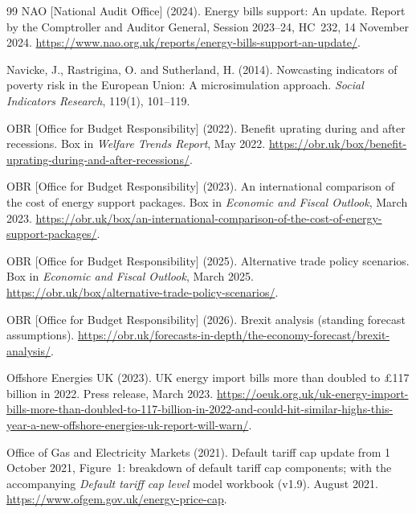 \begin{thebibliography}{99}
NAO [National Audit Office] (2024).
\newblock Energy bills support: An update.
\newblock Report by the Comptroller and Auditor General, Session 2023--24, HC~232, 14 November 2024. \url{https://www.nao.org.uk/reports/energy-bills-support-an-update/}.

Navicke, J., Rastrigina, O. and Sutherland, H. (2014).
\newblock Nowcasting indicators of poverty risk in the European Union: A microsimulation approach.
\newblock \emph{Social Indicators Research}, 119(1), 101--119.

OBR [Office for Budget Responsibility] (2022).
\newblock Benefit uprating during and after recessions.
\newblock Box in \emph{Welfare Trends Report}, May 2022. \url{https://obr.uk/box/benefit-uprating-during-and-after-recessions/}.

OBR [Office for Budget Responsibility] (2023).
\newblock An international comparison of the cost of energy support packages.
\newblock Box in \emph{Economic and Fiscal Outlook}, March 2023. \url{https://obr.uk/box/an-international-comparison-of-the-cost-of-energy-support-packages/}.

OBR [Office for Budget Responsibility] (2025).
\newblock Alternative trade policy scenarios.
\newblock Box in \emph{Economic and Fiscal Outlook}, March 2025. \url{https://obr.uk/box/alternative-trade-policy-scenarios/}.

OBR [Office for Budget Responsibility] (2026).
\newblock Brexit analysis (standing forecast assumptions).
\newblock \url{https://obr.uk/forecasts-in-depth/the-economy-forecast/brexit-analysis/}.

Offshore Energies UK (2023).
\newblock UK energy import bills more than doubled to \pounds 117 billion in 2022.
\newblock Press release, March 2023. \url{https://oeuk.org.uk/uk-energy-import-bills-more-than-doubled-to-117-billion-in-2022-and-could-hit-similar-highs-this-year-a-new-offshore-energies-uk-report-will-warn/}.

Office of Gas and Electricity Markets (2021).
\newblock Default tariff cap update from 1 October 2021, Figure~1: breakdown of default tariff cap components; with the accompanying \emph{Default tariff cap level} model workbook (v1.9).
 August 2021. \url{https://www.ofgem.gov.uk/energy-price-cap}.


\end{thebibliography}
